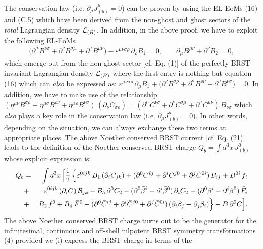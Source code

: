 \documentclass[12pt]{article}
\begin{document}
The conservation law (i.e. $\partial_\mu J^\mu_{(b)} = 0$) can be proven by using the EL-EoMs (16) and (C.5) which have been derived 
from the non-ghost and ghost sectors of the {\it total} Lagrangian density ${\cal L}_{(B)}$. In addition, 
in the above proof, we have to exploit the following EL-EoMs
\begin{eqnarray}\label{22}
\big (\partial^\mu B^{\nu\sigma} + \partial^\nu B^{\sigma\mu}  + \partial^\sigma B^{\mu\nu} \big ) 
- \varepsilon^{\mu\nu\sigma\rho}\, \partial_\rho B_1 = 0, \qquad
\partial_\mu B^{\mu\nu} + \partial^\nu B_2 = 0,
\end{eqnarray}
which emerge out from the non-ghost sector [cf. Eq. (1)] of the perfectly BRST-invariant Lagrangian density ${\cal L}_{(B)}$ where the first
entry is nothing but equation (16)  which can {\it also} be expressed as: $\varepsilon^{\mu\nu\sigma\rho}\, \partial_\mu B_1
+ \big (\partial^\nu B^{\sigma\rho} + \partial^\sigma B^{\rho\nu}  + \partial^\rho B^{\nu\sigma} \big ) = 0 $. In addition, we have to 
make use of the relationship: $(\eta^{\mu\nu}  B^{\sigma\rho} + \eta^{\mu\sigma} B^{\rho\nu} + \eta^{\mu\rho} B^{\nu\sigma})\, (\partial_\nu C_{\sigma\rho})
= (\partial^\mu C^{\nu\sigma} + \partial^\nu C^{\sigma\mu} + \partial^\sigma C^{\mu\nu})\, B_{\nu\sigma} $ which {\it also} plays a key role in the 
conservation law (i.e. $\partial_\mu J^\mu_{(b)} = 0 $). In other words, depending on the situation, we can always exchange these
two terms at appropriate places. The above Noether conserved BRST current [cf. Eq. (21)] leads to the definition
of the Noether conserved BRST charge $Q_{b} = \int d^3 x\, J^0_{(b)}$ whose explicit expression is:
\begin{eqnarray}\label{23}
Q_b &=&   \int d^3 x\, \Big [\dfrac{1}{2}\,\Big \{\varepsilon^{0ijk}\, B_1 \,(\partial_i C_{jk}) 
+ (\partial^0 C^{ij} + \partial^i C^{j0} + \partial^j C^{0i})\, B_{ij}
 + B^{0i}\,f_i  \nonumber\\
&+& \varepsilon^{0ijk}\, (\partial_i C)\, {\cal B}_{jk} - B_5 \, \partial^0 C_2 - (\partial^0 \bar \beta^i
- \partial^i \bar \beta^0)\, \partial_i C_2 - (\partial^0 \beta^i - \partial^i \beta^0)\, \bar F_i  \nonumber\\
&+& B_2\, f^0 + B_4\, \bar F^0 - (\partial^0 \bar C^{ij} + \partial^i \bar C^{j0} + \partial^j \bar C^{0i})\,(\partial_i \beta_j
- \partial_j \beta_i) \Big \} - B \, \partial^0 C \Big ].
\end{eqnarray}
The above Noether conserved BRST charge turns out to be the generator for the infinitesimal,
continuous and off-shell nilpotent BRST symmetry transformations (4) provided we (i) express the BRST charge in terms of the
\end{document}
